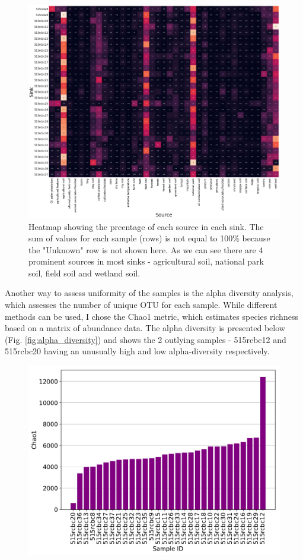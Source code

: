 \documentclass[12pt]{article}
\begin{document}
\begin{multicols}{2}
\begin{figure}[H]
	\includegraphics[width=\linewidth]{../sourcetracker/heatmap_perc.png}
	\caption{Heatmap showing the prcentage of each source in each sink. The sum of values for each sample (rows) is not equal to 100\% because the "Unknown" row is not shown here. As we can see there are 4 prominent sources in most sinks - agricultural soil, national park soil, field soil and wetland soil.}
	\label{fig:sourcetracker_heatmap}
\end{figure}
\par
Another way to assess uniformity of the samples is the alpha diversity analysis, which assesses the number of unique OTU for each sample. 
While different methods can be used, I chose the Chao1 metric, which estimates species richness based on a matrix of abundance data. 
The alpha diversity is presented below (Fig. \ref{fig:alpha_diversity}) and shows the 2 outlying samples - 515rcbc12 and 515rcbc20 having an unusually high and low alpha-diversity respectively.
\begin{figure}[H]
	\captionsetup{width=\linewidth}
	\includegraphics[width=\linewidth]{../analyses/figs/chao1_alpha.pdf}

\end{figure}
\end{multicols}
\end{document}
